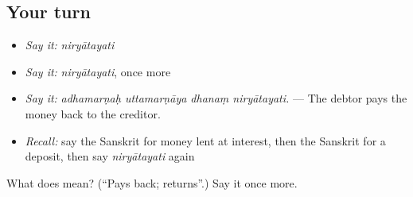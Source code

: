 \subsection*{Your turn}
\begin{itemize}
\raggedright
  \item \emph{Say it:} \emph{niryātayati}
  \item \emph{Say it:} \emph{niryātayati}, once more
  \item \emph{Say it:} \emph{adhamarṇaḥ uttamarṇāya dhanaṃ niryātayati.} — The debtor pays the money back to the creditor.
  \item \emph{Recall:} say the Sanskrit for money lent at interest, then the Sanskrit for a deposit, then say \emph{niryātayati} again
\end{itemize}

\begin{tcolorbox}[breakable,colback=teal!4,colframe=teal!35!black,title={Before you move on}]
What does  mean? (\textquotedblleft{}Pays back; returns\textquotedblright{}.) Say it once more.
\end{tcolorbox}
